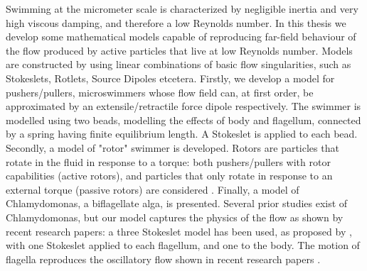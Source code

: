 
Swimming at the micrometer scale is characterized by negligible inertia and very high viscous damping, and therefore a low Reynolds number. In this thesis we develop some mathematical models capable of reproducing far-field behaviour of the flow produced by active particles that live at low Reynolds number. Models are constructed by using linear combinations of basic flow singularities, such as Stokeslets, Rotlets, Source Dipoles etcetera. Firstly, we develop a model for pushers/pullers, microswimmers whose flow field can, at first order, be approximated by an extensile/retractile force dipole respectively. The swimmer is modelled using two beads, modelling the effects of body and flagellum, connected by a spring having finite equilibrium length. A Stokeslet is applied to each bead. Secondly, a model of "rotor" swimmer is developed. Rotors are particles that rotate in the fluid in response to a torque: both pushers/pullers with rotor capabilities (active rotors), and particles that only rotate in response to an external torque (passive rotors) are considered \cite{active_passive_rotors}. Finally, a model of Chlamydomonas, a biflagellate alga, is presented. Several prior studies exist of Chlamydomonas, but our model captures the physics of the flow as shown by recent research papers: a three Stokeslet model has been used, as proposed by \cite{Drescher_Chlamydemonas}, with one Stokeslet applied to each flagellum, and one to the body. The motion of flagella reproduces the oscillatory flow shown in recent research papers \cite{Oscillatory_Guasto}.